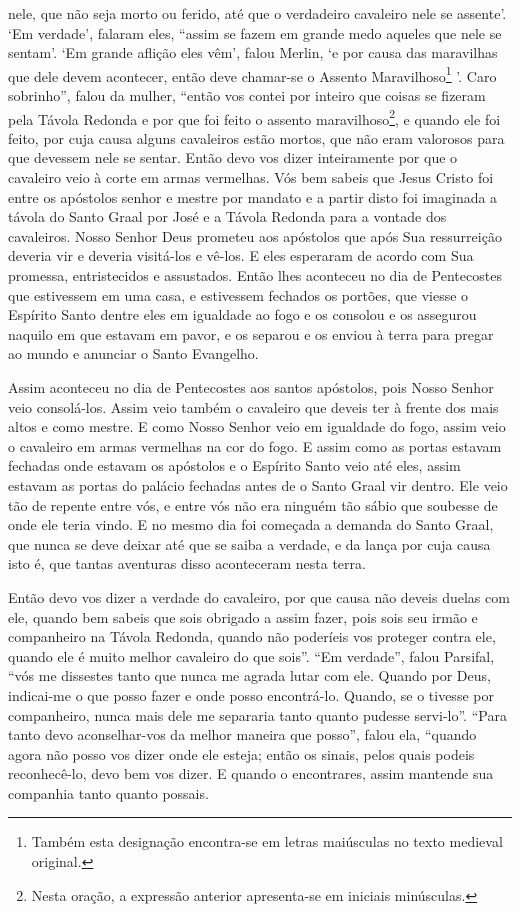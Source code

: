 nele, que não seja morto ou ferido, até que o verdadeiro cavaleiro nele se
assente’. ‘Em verdade’, falaram eles, “assim se fazem em grande medo aqueles
que nele se sentam’. ‘Em grande aflição eles vêm’, falou Merlin, ‘e por causa
das maravilhas que dele devem acontecer, então deve chamar-se o Assento
Maravilhoso\footnote{ Também esta designação encontra-se em letras maiúsculas
no texto medieval original.} ’. Caro sobrinho”, falou da mulher,
“então vos contei por inteiro que coisas se fizeram pela Távola Redonda e por
que foi feito o assento maravilhoso\footnote{ Nesta oração, a expressão
anterior apresenta-se em iniciais minúsculas.},  e quando ele foi
feito, por cuja causa alguns cavaleiros estão mortos, que não eram valorosos
para que devessem nele se sentar. Então devo vos dizer inteiramente por que o
cavaleiro veio à corte em armas vermelhas. Vós bem sabeis que Jesus Cristo foi
entre os apóstolos senhor e mestre por mandato e a partir disto foi imaginada a
távola do Santo Graal por José e a Távola Redonda para a vontade dos
cavaleiros. Nosso Senhor Deus prometeu aos apóstolos que após Sua ressurreição
deveria vir e deveria visitá-los e vê-los. E eles esperaram de acordo com Sua
promessa, entristecidos e assustados. Então lhes aconteceu no dia de
Pentecostes que estivessem em uma casa, e estivessem fechados os portões, que
viesse o Espírito Santo dentre eles em igualdade ao fogo e os consolou e os
assegurou naquilo em que estavam em pavor, e os separou e os enviou à terra
para pregar ao mundo e anunciar o Santo Evangelho.

Assim aconteceu no dia de Pentecostes aos santos apóstolos, pois Nosso
Senhor veio consolá-los. Assim veio também o cavaleiro que deveis ter à frente
dos mais altos e como mestre.  E como Nosso Senhor veio em igualdade do fogo,
assim veio o cavaleiro em armas vermelhas na cor do fogo. E assim como as
portas estavam fechadas onde estavam os apóstolos e o Espírito Santo veio até
eles, assim estavam as portas do palácio fechadas antes de o Santo Graal vir
dentro. Ele veio tão de repente entre vós, e entre vós não era ninguém tão
sábio que soubesse de onde ele teria vindo. E no mesmo dia foi começada a
demanda do Santo Graal, que nunca se deve deixar até que se saiba a verdade, e
da lança por cuja causa isto é, que tantas aventuras disso aconteceram nesta
terra. 

Então devo vos dizer a verdade do cavaleiro, por que causa não deveis duelas
com ele, quando bem sabeis que sois obrigado a assim fazer, pois sois seu irmão
e companheiro na Távola Redonda, quando não poderíeis vos proteger contra ele,
quando ele é muito melhor cavaleiro do que sois”. “Em
verdade”, falou Parsifal, “vós me dissestes tanto que nunca me agrada lutar
com ele. Quando por Deus, indicai-me o que posso fazer e onde posso
encontrá-lo. Quando, se o tivesse por companheiro, nunca mais dele me separaria
tanto quanto pudesse servi-lo”. “Para tanto devo aconselhar-vos da
melhor maneira que posso”, falou ela, “quando agora não posso vos dizer onde
ele esteja; então os sinais, pelos quais podeis reconhecê-lo, devo bem vos
dizer. E quando o encontrares, assim mantende sua companhia tanto quanto
possais. 

